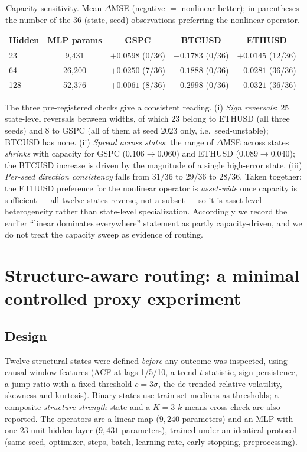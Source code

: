 \documentclass[preprint,12pt]{elsarticle}
\begin{document}
\begin{table}[!t]
\centering
\small
\caption{Capacity sensitivity. Mean $\Delta$MSE (negative $=$ nonlinear better); in
parentheses the number of the 36 (state, seed) observations preferring the nonlinear operator.}
\label{tab:cap}
\begin{tabular}{@{}lcccc@{}}
\toprule
Hidden & MLP params & GSPC & BTCUSD & ETHUSD \\
\midrule
23  & 9{,}431  & $+0.0598$ (0/36)  & $+0.1783$ (0/36)  & $+0.0145$ (12/36) \\
64  & 26{,}200 & $+0.0250$ (7/36)  & $+0.1888$ (0/36)  & $\mathbf{-0.0281}$ (36/36) \\
128 & 52{,}376 & $+0.0061$ (8/36)  & $+0.2998$ (0/36)  & $\mathbf{-0.0321}$ (36/36) \\
\bottomrule
\end{tabular}
\end{table}

The three pre-registered checks give a consistent reading. (i) \emph{Sign reversals}: 25
state-level reversals between widths, of which 23 belong to ETHUSD (all three seeds) and 8 to
GSPC (all of them at seed 2023 only, i.e.\ seed-unstable); BTCUSD has none. (ii)
\emph{Spread across states}: the range of $\Delta$MSE across states \emph{shrinks} with capacity
for GSPC ($0.106 \to 0.060$) and ETHUSD ($0.089 \to 0.040$); the BTCUSD increase is driven by
the magnitude of a single high-error state. (iii) \emph{Per-seed direction consistency} falls
from $31/36$ to $29/36$ to $28/36$. Taken together: the ETHUSD preference for the nonlinear
operator is \emph{asset-wide} once capacity is sufficient --- all twelve states reverse, not a
subset --- so it is asset-level heterogeneity rather than state-level specialization. Accordingly
we record the earlier ``linear dominates everywhere'' statement as partly capacity-driven, and
we do not treat the capacity sweep as evidence of routing.

\section{Structure-aware routing: a minimal controlled proxy experiment}
\label{sec:routing}

\subsection{Design}
Twelve structural states were defined \emph{before} any outcome was inspected, using
causal window features (ACF at lags 1/5/10, a trend $t$-statistic, sign persistence, a jump
ratio with a fixed threshold $c=3\sigma$, the de-trended relative volatility, skewness and
kurtosis). Binary states use train-set medians as thresholds; a composite \emph{structure
strength} state and a $K{=}3$ $k$-means cross-check are also reported. The operators are a
linear map ($9{,}240$ parameters) and an MLP with one 23-unit hidden layer ($9{,}431$
parameters), trained under an identical protocol (same seed, optimizer, steps, batch,
learning rate, early stopping, preprocessing).
\end{document}

